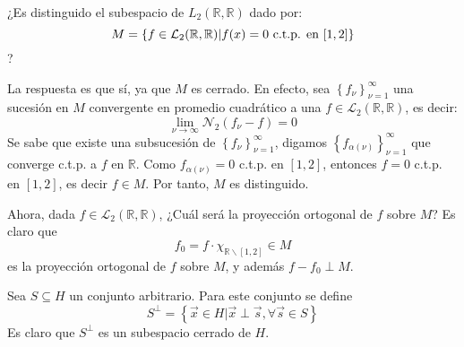 \documentclass[12pt]{report}
\theoremstyle{largebreak}
\begin{document}
    \begin{exa}
        ¿Es distinguido el subespacio de $L_2(\mathbb{R},\mathbb{R})$ dado por:
        \begin{equation*}
            M=\left\{f\in\mathcal{L}_2(\mathbb{R},\mathbb{R})| f(x)=0\textup{ c.t.p. en }[1,2] \right\}
        \end{equation*}
        ?
        
        La respuesta es que sí, ya que $M$ es cerrado. En efecto, sea $\left\{f_\nu\right\}_{\nu=1}^{\infty}$ una sucesión en $M$ convergente en promedio cuadrático a una $f\in\mathcal{L}_2(\mathbb{R},\mathbb{R})$, es decir:
        \begin{equation*}
            \lim_{\nu\rightarrow\infty}\mathcal{N}_2(f_\nu-f)=0
        \end{equation*}
        Se sabe que existe una subsucesión de $\left\{f_\nu\right\}_{\nu=1}^{\infty}$, digamos $\left\{f_{\alpha(\nu)}\right\}_{\nu=1}^{\infty}$ que converge c.t.p. a $f$ en $\mathbb{R}$. Como $f_{\alpha(\nu)}=0$ c.t.p. en $[1,2]$, entonces $f=0$ c.t.p. en $[1,2]$, es decir $f\in M$. Por tanto, $M$ es distinguido.

        Ahora, dada $f\in\mathcal{L}_2(\mathbb{R},\mathbb{R})$, ¿Cuál será la proyección ortogonal de $f$ sobre $M$? Es claro que
        \begin{equation*}
            f_0=f\cdot\chi_{\mathbb{R}\backslash[1,2]}\in M
        \end{equation*}
        es la proyección ortogonal de $f$ sobre $M$, y además $f-f_0\perp M$.
    \end{exa}

    \begin{mydef}
        Sea $S\subseteq H$ un conjunto arbitrario. Para este conjunto se define
        \begin{equation*}
            S^{\perp}=\left\{\vec{x}\in H|\vec{x}\perp\vec{s},\forall\vec{s}\in S \right\}
        \end{equation*}
        Es claro que $S^\perp$ es un subespacio cerrado de $H$.
    \end{mydef}
\end{document}
